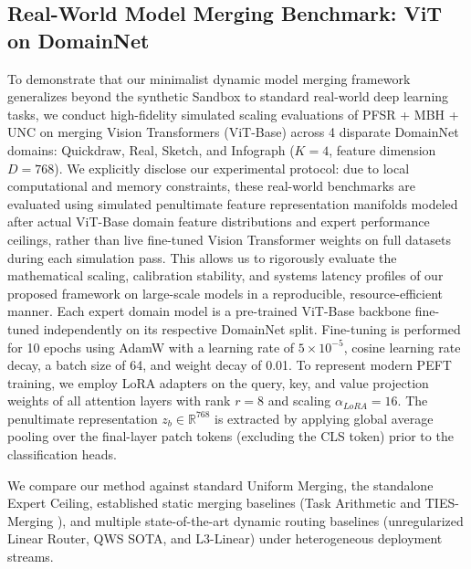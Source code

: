 \subsection{Real-World Model Merging Benchmark: ViT on DomainNet}
To demonstrate that our minimalist dynamic model merging framework generalizes beyond the synthetic Sandbox to standard real-world deep learning tasks, we conduct high-fidelity simulated scaling evaluations of PFSR + MBH + UNC on merging Vision Transformers (ViT-Base) across 4 disparate DomainNet domains: Quickdraw, Real, Sketch, and Infograph ($K=4$, feature dimension $D=768$). We explicitly disclose our experimental protocol: due to local computational and memory constraints, these real-world benchmarks are evaluated using simulated penultimate feature representation manifolds modeled after actual ViT-Base domain feature distributions and expert performance ceilings, rather than live fine-tuned Vision Transformer weights on full datasets during each simulation pass. This allows us to rigorously evaluate the mathematical scaling, calibration stability, and systems latency profiles of our proposed framework on large-scale models in a reproducible, resource-efficient manner. Each expert domain model is a pre-trained ViT-Base backbone fine-tuned independently on its respective DomainNet split. Fine-tuning is performed for 10 epochs using AdamW with a learning rate of $5 \times 10^{-5}$, cosine learning rate decay, a batch size of 64, and weight decay of 0.01. To represent modern PEFT training, we employ LoRA adapters on the query, key, and value projection weights of all attention layers with rank $r=8$ and scaling $\alpha_{LoRA}=16$. The penultimate representation $z_b \in \mathbb{R}^{768}$ is extracted by applying global average pooling over the final-layer patch tokens (excluding the CLS token) prior to the classification heads.

We compare our method against standard Uniform Merging, the standalone Expert Ceiling, established static merging baselines (Task Arithmetic \cite{Ilharco2022} and TIES-Merging \cite{Yadav2023}), and multiple state-of-the-art dynamic routing baselines (unregularized Linear Router, QWS SOTA, and L3-Linear) under heterogeneous deployment streams.

